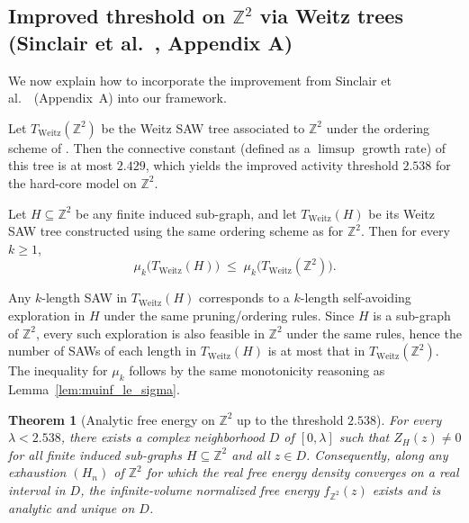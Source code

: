 \documentclass[a4paper,11pt]{article}
\theoremstyle{plain}
\newtheorem{theorem}{Theorem}[section]
\theoremstyle{definition}
\theoremstyle{remark}
\newcommand{\1}{\mathbf{1}}
\begin{document}
\subsection{Improved threshold on $\mathbb{Z}^2$ via Weitz trees (Sinclair et al.~\cite{sinclair2017spatial}, Appendix A)}
\label{subsec:2.538}
We now explain how to incorporate the improvement from Sinclair et al.~\cite{sinclair2017spatial}\ (Appendix~A) into our framework.

Let $T_{\mathrm{Weitz}}(\mathbb{Z}^2)$ be the Weitz SAW tree associated to $\mathbb{Z}^2$ under the ordering scheme
of \cite[App.~A]{sinclair2017spatial}. Then the connective constant (defined as a $\limsup$ growth rate) of this tree is at
most $2.429$, which yields the improved activity threshold $2.538$ for the hard-core model on $\mathbb{Z}^2$.


Let $H\subseteq \mathbb{Z}^2$ be any finite induced sub-graph, and let $T_{\mathrm{Weitz}}(H)$ be its Weitz SAW tree
constructed using the same ordering scheme as for $\mathbb{Z}^2$.
Then for every $k\ge 1$,
\begin{equation}
  \mu_k\!\bigl(T_{\mathrm{Weitz}}(H)\bigr)\;\le\; \mu_k\!\bigl(T_{\mathrm{Weitz}}(\mathbb{Z}^2)\bigr).
\end{equation}

Any $k$-length SAW in $T_{\mathrm{Weitz}}(H)$ corresponds to a $k$-length self-avoiding exploration in $H$ under
the same pruning/ordering rules. Since $H$ is a sub-graph of $\mathbb{Z}^2$, every such exploration is also feasible
in $\mathbb{Z}^2$ under the same rules, hence the number of SAWs of each length in $T_{\mathrm{Weitz}}(H)$ is at most
that in $T_{\mathrm{Weitz}}(\mathbb{Z}^2)$. The inequality for $\mu_k$ follows by the same monotonicity reasoning as
Lemma~\ref{lem:muinf_le_sigma}.

\begin{theorem}[Analytic free energy on $\mathbb{Z}^2$ up to the threshold $2.538$]
\label{thm:z2_2538}
For every $\lambda<2.538$, there exists a complex neighborhood $D$ of $[0,\lambda]$ such that $Z_H(z)\neq 0$ for all
finite induced sub-graphs $H\subseteq \mathbb{Z}^2$ and all $z\in D$. Consequently, along any exhaustion $(H_n)$ of
$\mathbb{Z}^2$ for which the real free energy density converges on a real interval in $D$, the infinite-volume
normalized free energy $f_{\mathbb{Z}^2}(z)$ exists and is analytic and unique on $D$.
\end{theorem}
\end{document}
